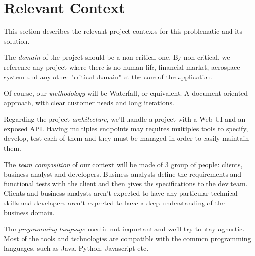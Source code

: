 \section{Relevant Context}\label{sec:relevant-context}
This section describes the relevant project contexts for this problematic
and its solution.

The \textit{domain} of the project should be a non-critical one.
By non-critical, we reference any project where there is no human life,
financial market, aerospace system and any other "critical domain" at
the core of the application.

Of course, our \textit{methodology} will be Waterfall, or equivalent.
A document-oriented approach, with clear customer needs and long iterations.

Regarding the project \textit{architecture}, we'll handle a project with
a Web UI and an exposed API\@.
Having multiples endpoints may requires multiples tools to specify, develop,
test each of them and they must be managed in order to easily maintain them.

The \textit{team composition} of our context will be made of 3 group of people:
clients, business analyst and developers.
Business analysts define the requirements and functional tests with the client
and then gives the specifications to the dev team.
Clients and business analysts aren't expected to have any particular technical
skills and developers aren't expected to have a deep understanding of the
business domain.

The \textit{programming language} used is not important and we'll try to stay
agnostic.
Most of the tools and technologies are compatible with the common programming
languages, such as Java, Python, Javascript etc.